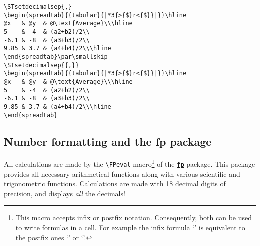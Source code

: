 \documentclass[a4paper,10pt]{article}
\newcommand\falseverb[1]{\texttt{\detokenize{#1}}}
\begin{document}
\begin{<table environment>}
\begin{minipage}{0.65\linewidth}
\begin{lstlisting}
\STsetdecimalsep{,}
\begin{spreadtab}{{tabular}{|*3{>{$}r<{$}}|}}\hline
@x   & @y  & @\text{Average}\\\hline
5    & -4  & (a2+b2)/2\\
-6.1 & -8  & (a3+b3)/2\\
9.85 & 3.7 & (a4+b4)/2\\\hline
\end{spreadtab}\par\smallskip
\STsetdecimalsep{{,}}
\begin{spreadtab}{{tabular}{|*3{>{$}r<{$}}|}}\hline
@x   & @y  & @\text{Average}\\\hline
5    & -4  & (a2+b2)/2\\
-6.1 & -8  & (a3+b3)/2\\
9.85 & 3.7 & (a4+b4)/2\\\hline
\end{spreadtab}
\end{lstlisting}
\end{minipage}%
\begin{minipage}{0.35\linewidth}
\centering
\STsetdecimalsep{,}
\par\smallskip
\STsetdecimalsep{{,}}
\end{minipage}

\subsection{Number formatting and the {\ttfamily fp} package}
All calculations are made by the  \verb-\FPeval- macro\footnote{This macro accepts infix or postfix notation. Consequently, both can be used to write formulas in a cell. For example the infix formula `\falseverb{a1+b1}' is equivalent to the postfix ones `\falseverb{a1 b1 add}' or `\falseverb{a1 b1 +}'.} of the \href{http://www.ctan.org/tex-archive/macros/latex/contrib/fp/}{\texttt{\textbf{fp}}} package. This package provides all necessary arithmetical functions along with various scientific and trigonometric functions. Calculations are made with 18 decimal digits of precision, and \falseverb{fp} displays \emph{all} the decimals!


\end{<table environment>}
\end{document}

